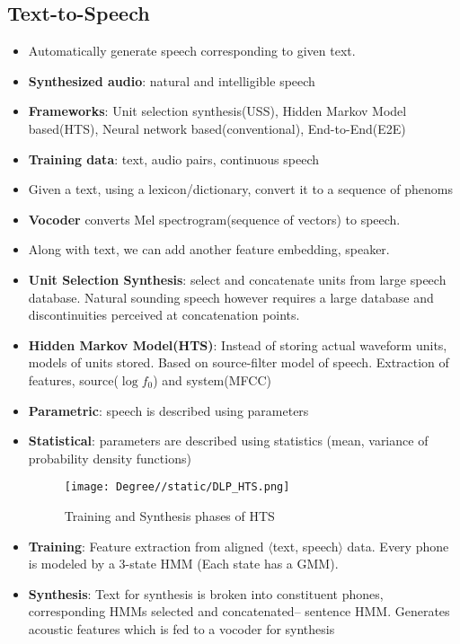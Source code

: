 \documentclass[a4paper]{article}
\begin{document}
\subsection{Text-to-Speech}
\begin{itemize}
    \item Automatically generate speech corresponding to given text.
    \item \textbf{Synthesized audio}: natural and intelligible speech
    \item \textbf{Frameworks}: Unit selection synthesis(USS), Hidden Markov Model based(HTS), Neural network based(conventional), End-to-End(E2E)
    \item \textbf{Training data}: text, audio pairs, continuous speech
    \item Given a text, using a lexicon/dictionary, convert it to a sequence of phenoms
    \item \textbf{Vocoder} converts Mel spectrogram(sequence of vectors) to speech.
    \item Along with text, we can add another feature embedding, speaker.
    \item \textbf{Unit Selection Synthesis}: select and concatenate units from large speech database. Natural sounding speech however requires a large database and discontinuities perceived at concatenation points.
    \item \textbf{Hidden Markov Model(HTS)}: Instead of storing actual waveform units, models of units stored. Based on source-filter model of speech. Extraction of features, source($\log{f_0}$) and system(MFCC)
    \item \textbf{Parametric}: speech is described using parameters
    \item \textbf{Statistical}: parameters are described using statistics (mean, variance of probability density functions)
    \begin{figure}[H]
        \centering
        \texttt{[image: Degree//static/DLP\_HTS.png]}
        \caption{Training and Synthesis phases of HTS}
    \end{figure}
    \item \textbf{Training}: Feature extraction from aligned $\langle$text, speech$\rangle$ data. Every phone is modeled by a 3-state HMM (Each state has a GMM).
    \item \textbf{Synthesis}: Text for synthesis is broken into constituent phones, corresponding HMMs selected and concatenated– sentence HMM. Generates acoustic features which is fed to a vocoder for synthesis

\end{itemize}
\end{document}
